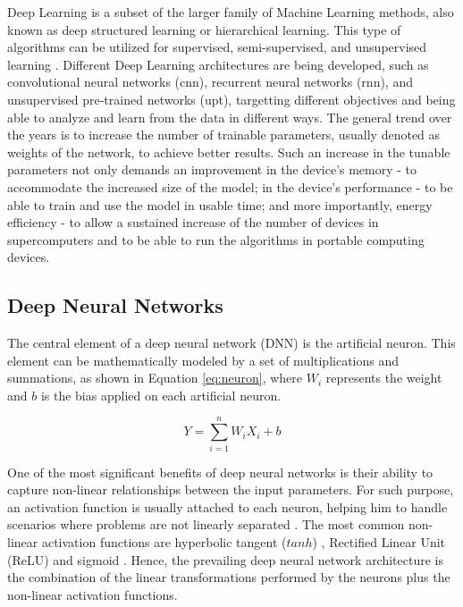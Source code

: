 Deep Learning is a subset of the larger family of Machine Learning methods, also known as deep structured learning or hierarchical learning. This type of algorithms can be utilized for supervised, semi-supervised, and unsupervised learning \cite{bengio_representation_2013, schmidhuber_deep_2015}. Different Deep Learning architectures are being developed, such as convolutional neural networks (\acrshort{cnn}), recurrent neural networks (\acrshort{rnn}), and unsupervised pre-trained networks (\acrshort{upt}), targetting different objectives and being able to analyze and learn from the data in different ways. The general trend over the years is to increase the number of trainable parameters, usually denoted as weights of the network, to achieve better results. Such an increase in the tunable parameters not only demands an improvement in the device's memory - to accommodate the increased size of the model; in the device's performance - to be able to train and use the model in usable time; and more importantly, energy efficiency - to allow a sustained increase of the number of devices in supercomputers and to be able to run the algorithms in portable computing devices.

\subsection{Deep Neural Networks}

The central element of a deep neural network (DNN) is the artificial neuron. This element can be mathematically modeled by a set of multiplications and summations, as shown in Equation \ref{eq:neuron}, where $W_i$ represents the weight and $b$ is the bias applied on each artificial neuron.

\begin{equation}
\label{eq:neuron}
    Y = \sum_{i=1}^{n} W_iX_i+b
\end{equation}

One of the most significant benefits of deep neural networks is their ability to capture non-linear relationships between the input parameters. For such purpose, an activation function is usually attached to each neuron, helping him to handle scenarios where problems are not linearly separated \cite{dong_dnnmark:_2017}. The most common non-linear activation functions are hyperbolic tangent ($tanh$) \cite{orr_neural_1998}, Rectified Linear Unit (ReLU) \cite{orr_neural_1998} and sigmoid \cite{orr_neural_1998}. Hence, the prevailing deep neural network architecture is the combination of the linear transformations performed by the neurons plus the non-linear activation functions.

